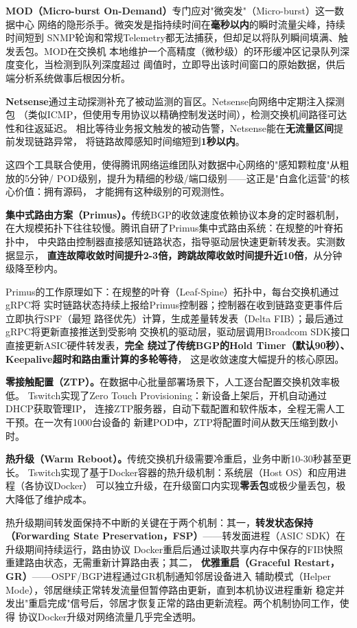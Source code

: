 \textbf{MOD（Micro-burst On-Demand）}专门应对"微突发"（Micro-burst）这一数据中心
网络的隐形杀手。微突发是指持续时间在\textbf{毫秒以内}的瞬时流量尖峰，持续时间短到
SNMP轮询和常规Telemetry都无法捕获，但却足以将队列瞬间填满、触发丢包。MOD在交换机
本地维护一个高精度（微秒级）的环形缓冲区记录队列深度变化，当检测到队列深度超过
阈值时，立即导出该时间窗口的原始数据，供后端分析系统做事后根因分析。

\textbf{Netsense}通过主动探测补充了被动监测的盲区。Netsense向网络中定期注入探测包
（类似ICMP，但使用专用协议以精确控制发送时间），检测交换机间路径可达性和往返延迟。
相比等待业务报文触发的被动告警，Netsense能在\textbf{无流量区间}提前发现链路异常，
将链路故障感知时间缩短到\textbf{1秒以内}。

这四个工具联合使用，使得腾讯网络运维团队对数据中心网络的"感知颗粒度"从粗放的5分钟/
POD级别，提升为精细的秒级/端口级别——这正是"白盒化运营"的核心价值：拥有源码，
才能拥有这种级别的可观测性。

\textbf{集中式路由方案（Primus）。}传统BGP的收敛速度依赖协议本身的定时器机制，
在大规模拓扑下往往较慢。腾讯自研了Primus集中式路由系统：在规整的叶脊拓扑中，
中央路由控制器直接感知链路状态，指导驱动层快速更新转发表。实测数据显示，
\textbf{直连故障收敛时间提升2-3倍，跨跳故障收敛时间提升近10倍}，从分钟级降至秒内。

Primus的工作原理如下：在规整的叶脊（Leaf-Spine）拓扑中，每台交换机通过gRPC将
实时链路状态持续上报给Primus控制器；控制器在收到链路变更事件后立即执行SPF（最短
路径优先）计算，生成差量转发表（Delta FIB）；最后通过gRPC将更新直接推送到受影响
交换机的驱动层，驱动层调用Broadcom SDK接口直接更新ASIC硬件转发表，\textbf{完全
绕过了传统BGP的Hold Timer（默认90秒）、Keepalive超时和路由重计算的多轮等待}，
这是收敛速度大幅提升的核心原因。

\textbf{零接触配置（ZTP）。}在数据中心批量部署场景下，人工逐台配置交换机效率极低。
Tswitch实现了Zero Touch Provisioning：新设备上架后，开机自动通过DHCP获取管理IP，
连接ZTP服务器，自动下载配置和软件版本，全程无需人工干预。在一次有1000台设备的
新建POD中，ZTP将配置时间从数天压缩到数小时。

\textbf{热升级（Warm Reboot）。}传统交换机升级需要冷重启，业务中断10-30秒甚至更长。
Tswitch实现了基于Docker容器的热升级机制：系统层（Host OS）和应用进程（各协议Docker）
可以独立升级，在升级窗口内实现\textbf{零丢包}或极少量丢包，极大降低了维护成本。

热升级期间转发面保持不中断的关键在于两个机制：其一，\textbf{转发状态保持（Forwarding
State Preservation，FSP）}——转发面进程（ASIC SDK）在升级期间持续运行，路由协议
Docker重启后通过读取共享内存中保存的FIB快照重建路由状态，无需重新计算路由表；其二，
\textbf{优雅重启（Graceful Restart，GR）}——OSPF/BGP进程通过GR机制通知邻居设备进入
辅助模式（Helper Mode），邻居继续正常转发流量但暂停路由更新，直到本机协议进程重新
稳定并发出"重启完成"信号后，邻居才恢复正常的路由更新流程。两个机制协同工作，使得
协议Docker升级对网络流量几乎完全透明。

